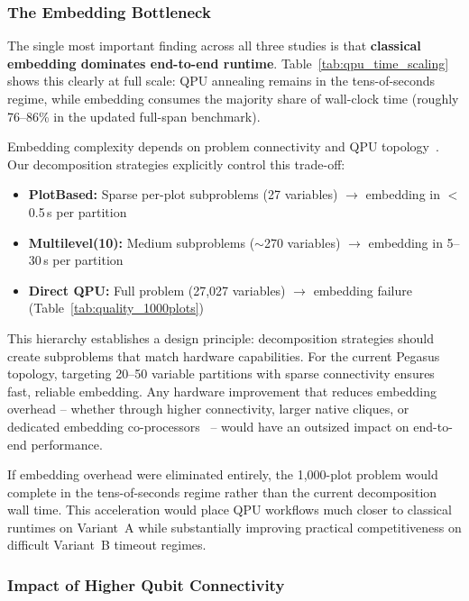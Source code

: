 \documentclass{oqireport}
\begin{document}
\subsubsection{The Embedding Bottleneck}

The single most important finding across all three studies is that \textbf{classical embedding dominates end-to-end runtime}. Table~\ref{tab:qpu_time_scaling} shows this clearly at full scale: QPU annealing remains in the tens-of-seconds regime, while embedding consumes the majority share of wall-clock time (roughly 76--86\% in the updated full-span benchmark).

Embedding complexity depends on problem connectivity and QPU topology~\cite{choi2008minor, zbinden2020embedding}. Our decomposition strategies explicitly control this trade-off:
\begin{itemize}
    \item \textbf{PlotBased:} Sparse per-plot subproblems (27 variables) $\to$ embedding in $<$0.5\,s per partition
    \item \textbf{Multilevel(10):} Medium subproblems ($\sim$270 variables) $\to$ embedding in 5--30\,s per partition
    \item \textbf{Direct QPU:} Full problem (27,027 variables) $\to$ embedding failure (Table~\ref{tab:quality_1000plots})
\end{itemize}

This hierarchy establishes a design principle: decomposition strategies should create subproblems that match hardware capabilities. For the current Pegasus topology, targeting 20--50 variable partitions with sparse connectivity ensures fast, reliable embedding. Any hardware improvement that reduces embedding overhead -- whether through higher connectivity, larger native cliques, or dedicated embedding co-processors~\cite{boothby2021zephyr} -- would have an outsized impact on end-to-end performance.

If embedding overhead were eliminated entirely, the 1,000-plot problem would complete in the tens-of-seconds regime rather than the current decomposition wall time. This acceleration would place QPU workflows much closer to classical runtimes on Variant~A while substantially improving practical competitiveness on difficult Variant~B timeout regimes.

\subsubsection{Impact of Higher Qubit Connectivity}
\end{document}
